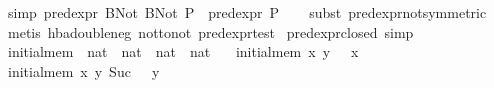 \begin{isabellebody}
\isanewline
{}\isamarkupfalse%
\ {}simp{}{}\ {}pred{}expr\ {}BNot\ {}BNot\ P{}{}\ {}\ pred{}expr\ P{}\isanewline
%
\isadelimproof
\ \ %
\endisadelimproof
%
\isatagproof
{}\isamarkupfalse%
\ {}subst\ pred{}expr{}not{}symmetric{}{}{}\isanewline
\ \ \isamarkupfalse%
\ {}metis\ hba{}double{}neg\ not{}to{}not\ pred{}expr{}test{}%
\endisatagproof
{\isafoldproof}%
%
\isadelimproof
\isanewline
%
\endisadelimproof
\isanewline
{}\isamarkupfalse%
\ pred{}expr{}closed\ {}simp{}\isanewline
\isanewline
{}\isamarkupfalse%
\ initial{}mem\ {}{}\ {}nat\ {}\ nat\ {}\ nat\ {}\ nat{}\ \isanewline
\ \ {}initial{}mem\ x\ y\ {}\ {}\ x{}\isanewline
{}\ {}initial{}mem\ x\ y\ {}Suc\ {}{}\ {}\ y{}\isanewline

\end{isabellebody}
